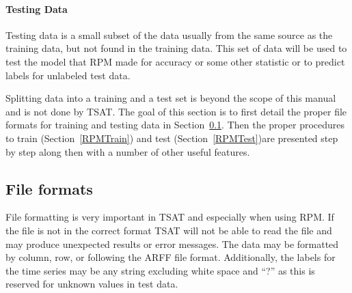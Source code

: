 \documentclass[titlepage, letterpaper, 12pt]{article}
\begin{document}
\paragraph{Testing Data}
Testing data is a small subset of the data usually from the same source as the training data, but not found in the training data. This set of data will be used to test the model that RPM made for accuracy or some other statistic or to predict labels for unlabeled test data.

Splitting data into a training and a test set is beyond the scope of this manual and is not done by TSAT. The goal of this section is to first detail the proper file formats for training and testing data in Section~\ref{RPMFile}. Then the proper procedures to train (Section~\ref{RPMTrain}) and test (Section~\ref{RPMTest})are presented step by step along then with a number of other useful features. 

\subsection{File formats}
\label{RPMFile}
File formatting is very important in TSAT and especially when using RPM.  If the file is not in the correct format TSAT will not be able to read the file and may produce unexpected results or error messages.  The data may be formatted by column, row, or following the ARFF file format. Additionally, the labels for the time series may be any string excluding white space and ``?'' as this is reserved for unknown values in test data.
\end{document}
